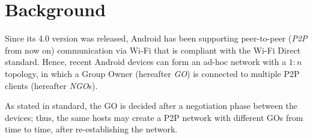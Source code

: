 \section{Background} %
Since its 4.0 version was released, Android has been supporting peer-to-peer
(\textit{P2P} from now on) communication via Wi-Fi that is compliant with the
Wi-Fi Direct standard\cite{bib:wifiP2pspec}.
Hence, recent Android devices can form an ad-hoc network with a $1:n$ topology,
in which a Group Owner (hereafter \textit{GO}) is connected to multiple P2P
clients (hereafter \textit{NGO}s).

As stated in standard, the GO is decided after a negotiation phase between the
devices; thus, the same hosts may create a P2P network with different GOs from
time to time, after re-establishing the network.
